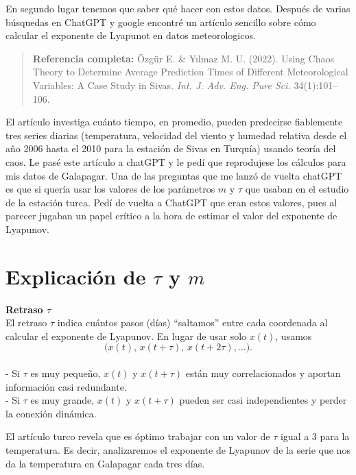 \documentclass[
  11pt,
  a4paper,
  DIV=11,
  numbers=noendperiod]{scrreprt}
\begin{document}
En segundo lugar tenemos que saber qué hacer con estos datos. Después de
varias búsquedas en ChatGPT y google encontré un artículo sencillo sobre
cómo calcular el exponente de Lyapunot en datos meteorologicos.

\begin{quote}
\textbf{Referencia completa:} Özgür E. \& Yılmaz M. U. (2022). Using
Chaos Theory to Determine Average Prediction Times of Different
Meteorological Variables: A Case Study in Sivas. \emph{Int. J. Adv. Eng.
Pure Sci.} 34(1):101--106.
\end{quote}

El artículo investiga cuánto tiempo, en promedio, pueden predecirse
fiablemente tres series diarias (temperatura, velocidad del viento y
humedad relativa desde el año 2006 hasta el 2010 para la estación de
Sivas en Turquía) usando teoría del caos. Le pasé este artículo a
chatGPT y le pedí que reprodujese los cálculos para mis datos de
Galapagar. Una de las preguntas que me lanzó de vuelta chatGPT es que si
quería usar los valores de los parámetros \(m\) y \(\tau\) que usaban en
el estudio de la estación turca. Pedí de vuelta a ChatGPT que eran estos
valores, pues al parecer jugaban un papel crítico a la hora de estimar
el valor del exponente de Lyapunov.

\section{\texorpdfstring{Explicación de \(\tau\) y
\(m\)}{Explicación de \textbackslash tau y m}}\label{explicaciuxf3n-de-tau-y-m}

\textbf{Retraso \(\tau\)}\\
El retraso \(\tau\) indica cuántos pasos (días) ``saltamos'' entre cada
coordenada al calcular el exponente de Lyapunov. En lugar de usar solo
\(x(t)\), usamos\\
\[
\bigl(x(t),\,x(t+\tau),\,x(t+2\tau),\dots\bigr).
\]\\
- Si \(\tau\) es muy pequeño, \(x(t)\) y \(x(t+\tau)\) están muy
correlacionados y aportan información casi redundante.\\
- Si \(\tau\) es muy grande, \(x(t)\) y \(x(t+\tau)\) pueden ser casi
independientes y perder la conexión dinámica.

El artículo turco revela que es óptimo trabajar con un valor de \(\tau\)
igual a 3 para la temperatura. Es decir, analizaremos el exponente de
Lyapunov de la serie que nos da la temperatura en Galapagar cada tres
días.
\end{document}
